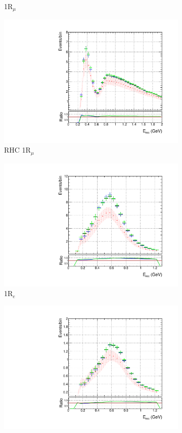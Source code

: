 \begin{figure}
\begin{subfigure}{.49\textwidth}
  \caption{1R$_{\mu}$}
  \label{fig:skppnumu}
\end{subfigure}
\begin{subfigure}{.49\textwidth}
  \centering
  \includegraphics[width=0.95\linewidth]{figs/polySKnumubar}
   \caption{RHC 1R$_{\mu}$}
  \label{fig:skppnumubar}
\end{subfigure}
\begin{subfigure}{.49\textwidth}
  \centering
  \includegraphics[width=0.95\linewidth]{figs/polySKnue}
  \caption{1R$_{e}$}
  \label{fig:skppnue}
\end{subfigure}
\begin{subfigure}{.49\textwidth}
  \centering
  \includegraphics[width=0.95\linewidth]{figs/polySKnuebar}

\end{subfigure}
\end{figure}
